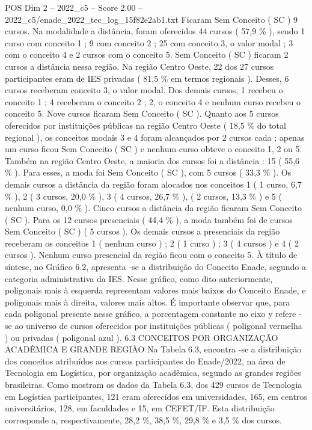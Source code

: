 \begin{textsample}{POS Dim 2 – 2022\_c5 – Score 2.00 – 2022\_c5/enade\_2022\_tec\_log\_15f82e2ab1.txt}
Ficaram Sem Conceito ( SC ) 9 cursos.
Na modalidade a distância, foram oferecidos 44 cursos ( 57,9 \% ), sendo 1 curso com conceito 1 ; 9 com conceito 2 ; 25 com conceito 3, o valor modal ; 3 com o conceito 4 e 2 cursos com o conceito 5.
Sem Conceito ( SC ) ficaram 2 cursos a distância nessa região.
Na região Centro Oeste, 22 dos 27 cursos participantes eram de IES privadas ( 81,5 \% em termos regionais ).
Desses, 6 cursos receberam conceito 3, o valor modal.
Dos demais cursos, 1 recebeu o conceito 1 ; 4 receberam o conceito 2 ; 2, o conceito 4 e nenhum curso recebeu o conceito 5.
Nove cursos ficaram Sem Conceito ( SC ).
Quanto aos 5 cursos oferecidos por instituições públicas na região Centro Oeste ( 18,5 \% do total regional ), os conceitos modais 3 e 4 foram alcançados por 2 cursos cada ; apenas um curso ficou Sem Conceito ( SC ) e nenhum curso obteve o conceito 1, 2 ou 5.
Também na região Centro Oeste, a maioria dos cursos foi a distância : 15 ( 55,6 \% ).
Para esses, a moda foi Sem Conceito ( SC ), com 5 cursos ( 33,3 \% ).
Os demais cursos a distância da região foram alocados nos conceitos 1 ( 1 curso, 6,7 \% ), 2 ( 3 cursos, 20,0 \% ), 3 ( 4 cursos, 26,7 \% ), ( 2 cursos, 13,3 \% ) e 5 ( nenhum curso, 0,0 \% ).
Cinco cursos a distância da região ficaram Sem Conceito ( SC ).
Para os 12 cursos presenciais ( 44,4 \% ), a moda também foi de cursos Sem Conceito ( SC ) ( 5 cursos ).
Os demais cursos a presenciais da região receberam os conceitos 1 ( nenhum curso ) ; 2 ( 1 curso ) ; 3 ( 4 cursos ) e 4 ( 2 cursos ).
Nenhum curso presencial da região ficou com o conceito 5.
À título de síntese, no Gráfico 6.2, apresenta -se a distribuição do Conceito Enade, segundo a categoria administrativa da IES.
Nesse gráfico, como dito anteriormente, poligonais mais à esquerda representam valores mais baixos do Conceito Enade, e poligonais mais à direita, valores mais altos.
É importante observar que, para cada poligonal presente nesse gráfico, a porcentagem constante no eixo y refere -se ao universo de cursos oferecidos por instituições públicas ( poligonal vermelha ) ou privadas ( poligonal azul ). 6.3 CONCEITOS POR ORGANIZAÇÃO ACADÊMICA E GRANDE REGIÃO Na Tabela 6.3, encontra -se a distribuição dos conceitos atribuídos aos cursos participantes do Enade/2022, na área de Tecnologia em Logística, por organização acadêmica, segundo as grandes regiões brasileiras.
Como mostram os dados da Tabela 6.3, dos 429 cursos de Tecnologia em Logística participantes, 121 eram oferecidos em universidades, 165, em centros universitários, 128, em faculdades e 15, em CEFET/IF.
Esta distribuição corresponde a, respectivamente, 28,2 \%, 38,5 \%, 29,8 \% e 3,5 \% dos cursos.

\end{textsample}
